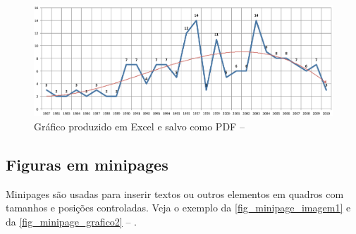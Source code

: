 \begin{figure}[htb]
    \caption[Gráfico produzido em Excel e salvo como PDF]{Gráfico produzido em Excel e salvo como PDF -- \showfont}
    \label{fig_grafico}
    \begin{center}
        \includegraphics[scale=0.35]{pictures/abntex2-modelo-img-grafico.pdf}
    \end{center}
\end{figure}

\subsection{Figuras em minipages}

Minipages são usadas para inserir textos ou outros elementos em quadros
com tamanhos e posições controladas. Veja o exemplo da
\autoref{fig_minipage_imagem1} e da \autoref{fig_minipage_grafico2} -- \showfont.

